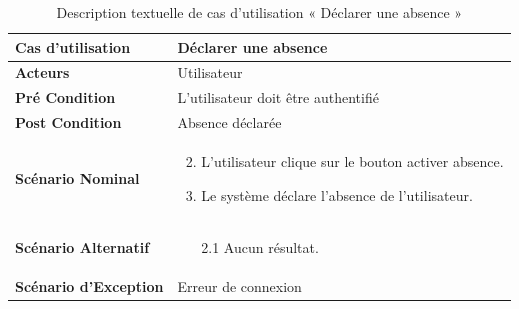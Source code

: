 \begin{longtable}{|p{5cm}|p{10cm}|}
  \caption{Description textuelle de cas d'utilisation « Déclarer une absence    »} \label{tab:use_case_declare_absence} \\
\hline
\textbf{Cas d'utilisation}&Déclarer une absence    \\
\hline
\textbf{Acteurs}&Utilisateur\\
\hline
\textbf{Pré Condition}&L'utilisateur doit être authentifié\\
\hline
\textbf{Post Condition}&Absence déclarée \\
\hline
\textbf{Scénario Nominal}&
\vspace{-\baselineskip}
\begin{enumerate}
  \setcounter{enumi}{1}
  \item L'utilisateur clique sur le bouton activer absence.
  \item Le système déclare l'absence de l'utilisateur.
  
\end{enumerate}\\
\hline
\textbf{Scénario Alternatif}&
\vspace{-\baselineskip}
\begin{enumerate}
 \item [2.1] Aucun résultat.
\end{enumerate}\\
\hline
\textbf{Scénario d'Exception}&
Erreur de connexion\\
\hline

\end{longtable}


